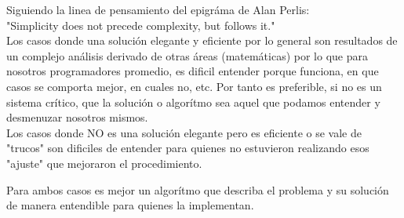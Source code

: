 \documentclass[a4paper,11pt]{article}
\theoremstyle{mytheor}
\begin{document}
\noindent Siguiendo la linea de pensamiento del epigráma de Alan Perlis: \\
"Simplicity does not precede complexity, but follows it." \\

Los casos donde  una solución elegante y eficiente por lo general son resultados de un complejo análisis derivado de otras áreas (matemáticas) por lo que para nosotros programadores promedio, es dificil entender porque funciona, en que casos se comporta mejor, en cuales no, etc. Por tanto es preferible, si no es un sistema crítico, que la solución o algorítmo sea aquel que podamos entender y desmenuzar nosotros mismos. \\
Los casos donde NO es una solución elegante pero es eficiente o se vale de "trucos" son dificiles de entender para quienes no estuvieron realizando esos "ajuste" que mejoraron el procedimiento.

Para ambos casos es mejor un algorítmo que describa el problema y su solución de manera entendible para quienes la implementan.
\end{document}
